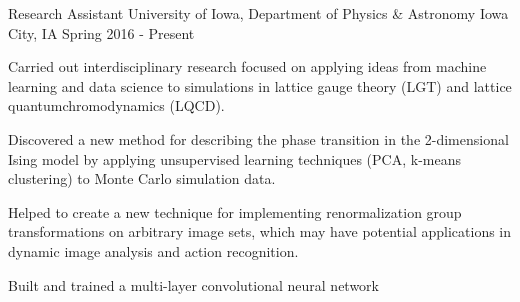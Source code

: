 \vspace{-1.75ex}


\begin{cventries}
  \cventry
  {Research Assistant} %
  {University of Iowa, Department of Physics \& Astronomy} %
  {Iowa City, IA} %
  {Spring 2016 - Present} %
  {
      \begin{cvitems} %
          \item {Carried out interdisciplinary research focused on applying
                  ideas from machine learning and data science to simulations in
                  lattice gauge theory (LGT) and lattice quantumchromodynamics 
                  (LQCD).}
          \item {Discovered a new method for describing the phase transition in
                  the 2-dimensional Ising model by applying unsupervised
                  learning techniques (PCA, k-means clustering) to Monte Carlo
                  simulation data.}
          \item {Helped to create a new technique for implementing
                  renormalization group transformations on arbitrary image
                  sets, which may have potential applications in dynamic image
                  analysis and action recognition.}
          \item {Built and trained a multi-layer convolutional neural network
}
\end{cvitems}}
\end{cventries}
